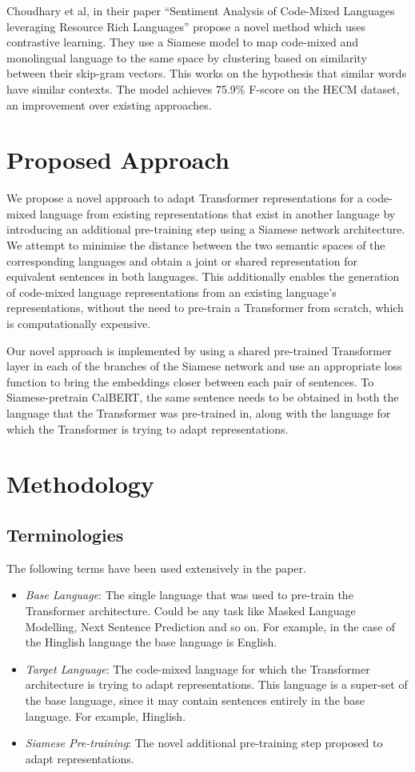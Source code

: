\documentclass[conference]{IEEEtran}
\begin{document}
Choudhary et al\cite{b14}, in their paper “Sentiment Analysis of Code-Mixed Languages leveraging Resource Rich Languages” propose a novel method which uses contrastive learning. They use a Siamese model to map code-mixed and monolingual language to the same space by clustering based on similarity between their skip-gram vectors. This works on the hypothesis that similar words have similar contexts. The model achieves 75.9\% F-score on the HECM dataset, an improvement over existing approaches.


\section{Proposed Approach}
We propose a novel approach to adapt Transformer representations for a code-mixed language from existing representations that exist in another language by introducing an additional pre-training step using a Siamese network architecture\cite{b3}. We attempt to minimise the distance between the two semantic spaces of the corresponding languages and obtain a joint or shared representation for equivalent sentences in both languages. This additionally enables the generation of code-mixed language representations from an existing language's representations, without the need to pre-train a Transformer from scratch, which is computationally expensive.

Our novel approach is implemented by using a shared pre-trained Transformer layer in each of the branches of the Siamese network and use an appropriate loss function to bring the embeddings closer between each pair of sentences. To Siamese-pretrain CalBERT, the same sentence needs to be obtained in both the language that the Transformer was pre-trained in, along with the language for which the Transformer is trying to adapt representations.

\section{Methodology}

\subsection{Terminologies}

The following terms have been used extensively in the paper.

\begin{itemize}
\item \textit{Base Language}: The single language that was used to pre-train the Transformer architecture. Could be any task like Masked Language Modelling\cite{b6}, Next Sentence Prediction and so on. For example, in the case of the Hinglish language the base language is English.
\item \textit{Target Language}: The code-mixed language for which the Transformer architecture is trying to adapt representations. This language is a super-set of the base language, since it may contain sentences entirely in the base language. For example, Hinglish.
\item \textit{Siamese Pre-training}: The novel additional pre-training step proposed to adapt representations.
\end{itemize}
\end{document}
